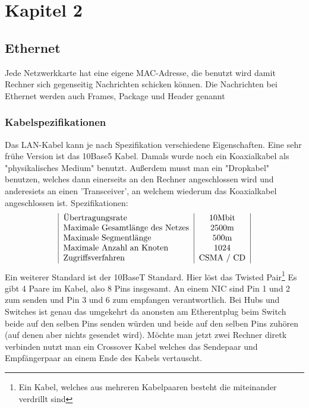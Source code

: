 \documentclass[a4paper,10pt]{scrartcl}
\begin{document}
\section{Kapitel 2}
    \subsection{Ethernet}
        Jede Netzwerkkarte hat eine eigene MAC-Adresse, die benutzt wird damit Rechner sich gegenseitig Nachrichten schicken können. Die Nachrichten bei Ethernet werden auch
        Frames, Package und Header genannt

        \subsubsection{Kabelspezifikationen}
            Das LAN-Kabel kann je nach Spezifikation verschiedene Eigenschaften. Eine sehr frühe Version ist das 10Base5 Kabel. Damals wurde noch ein Koaxialkabel als "physikalisches Medium"
            benutzt. Außerdem musst man ein "Dropkabel" benutzen, welches dann einerseits an den Rechner angeschlossen wird und anderesiets an einen 'Transceiver', an welchem wiederum das Koaxialkabel
            angeschlossen ist. Spezifikationen:
            \[
                \begin{tabular}{|l|c|}
                    Übertragungsrate & 10Mbit \\
                    Maximale Gesamtlänge des Netzes & 2500m \\
                    Maximale Segmentlänge & 500m \\
                    Maximale Anzahl an Knoten & 1024 \\
                    Zugriffsverfahren & CSMA / CD                
                \end{tabular}
            \]
            Ein weiterer Standard ist der 10BaseT Standard. Hier löst das Twisted Pair\footnote{Ein Kabel, welches aus mehreren Kabelpaaren besteht die miteinander verdrillt sind}
            Es gibt 4 Paare im Kabel, also 8 Pins insgesamt. An einem NIC sind Pin 1 und 2 zum senden und Pin 3 und 6 zum empfangen verantwortlich. Bei Hubs und Switches ist genau das
            umgekehrt da anonsten am Etherentplug beim Switch beide auf den selben Pins senden würden und beide auf den selben Pins zuhören (auf denen aber nichts gesendet wird).
            Möchte man jetzt zwei Rechner diretk verbinden nutzt man ein Crossover Kabel welches das Sendepaar und Empfängerpaar an einem Ende des Kabels vertauscht. 
\end{document}
